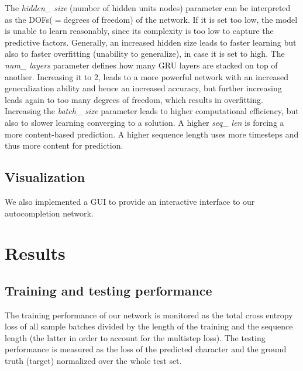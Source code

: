 \documentclass[11pt,a4paper,bibliography=totocnumbered,listof=totocnumbered]{scrartcl}
\begin{document}
The \textit{hidden\_ size} (number of hidden units\/ nodes) parameter can be interpreted as the DOFs($=$degrees of freedom) of the network. If it is set too low, the model is unable to learn reasonably, since its complexity is too low to capture the predictive factors. Generally, an increased hidden size leads to faster learning but also to faster overfitting (unability to generalize), in case it is set to high. The \textit{num\_ layers} parameter defines how many GRU layers are stacked on top of another. Increasing it to 2, leads to a more powerful network with an increased generalization ability and hence an increased accuracy, but further increasing leads again to too many degrees of freedom, which results in overfitting. Increasing the \textit{batch\_ size} parameter leads to higher computational efficiency, but also to slower learning\/ converging to a solution. A higher \textit{seq\_ len} is forcing a more content-based prediction. A higher sequence length uses more timesteps and thus more content for prediction.

\subsection{Visualization}
We also implemented a GUI to provide an interactive interface to our autocompletion network.  

\pagebreak

%
\section{Results} \label{sec:res}

\subsection{Training and testing performance}
The training performance of our network is monitored as the total cross entropy loss of all sample batches divided by the length of the training and the sequence length (the latter in order to account for the multistep loss). The testing performance is measured as the loss of the predicted character and the ground truth (target) normalized over the whole test set. 
\end{document}
